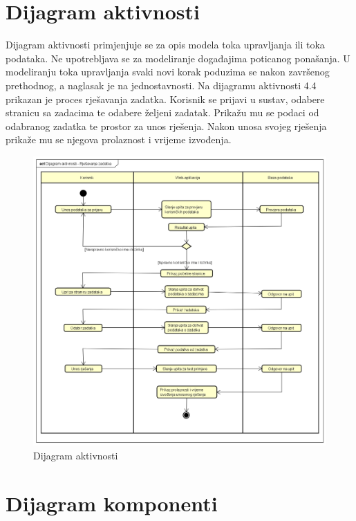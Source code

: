 			
			\eject 
		
		\section{Dijagram aktivnosti}
			
			Dijagram aktivnosti primjenjuje se za opis modela toka upravljanja ili toka podataka. Ne upotrebljava se za modeliranje događajima poticanog ponašanja. U modeliranju toka upravljanja svaki novi korak poduzima se nakon završenog prethodnog, a naglasak je na jednostavnosti. Na dijagramu aktivnosti 4.4 prikazan je proces rješavanja zadatka. Korisnik se prijavi u sustav, odabere stranicu sa zadacima te odabere željeni zadatak. Prikažu mu se podaci od odabranog zadatka te prostor za unos rješenja. Nakon unosa svojeg rješenja prikaže mu se njegova prolaznost i vrijeme izvođenja.
			
			\begin{figure}[H]
				\includegraphics[width=\textwidth]{slike/DijagramAktivnosti.png} %
				\caption{Dijagram aktivnosti}
				\label{fig:DijagramAktivnosti} %
			\end{figure}
						
			\eject
		\section{Dijagram komponenti}
		
